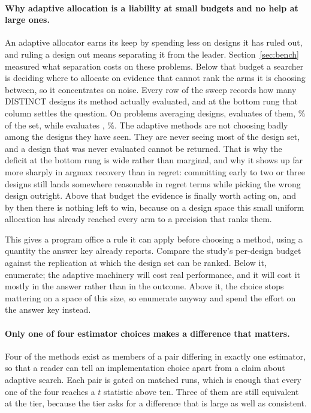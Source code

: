 \documentclass[11pt]{article}
\begin{document}
\paragraph{Why adaptive allocation is a liability at small budgets and no help at large ones.} An
adaptive allocator earns its keep by spending less on designs it has ruled out, and ruling a design
out means separating it from the leader. Section~\ref{sec:bench} measured what separation costs on
these problems. Below that budget a searcher is deciding where to allocate on evidence that cannot
rank the arms it is choosing between, so it concentrates on noise. Every row of the sweep records
how many DISTINCT designs its method actually evaluated, and at the bottom rung that column settles
the question. On problems averaging \RsLowDesigns{} designs, \RsCrossTop{} evaluates
\RsLowTouchAdapt{} of them, \RsLowCoverAdapt{}\% of the set, while \RsCrossLow{} evaluates
\RsLowTouchUni{}, \RsLowCoverUni{}\%. The adaptive methods are not choosing badly among the designs
they have seen. They are never seeing most of the design set, and a design that was never evaluated
cannot be returned. That is why the deficit at the bottom rung is wide rather than marginal, and why
it shows up far more sharply in argmax recovery than in regret: committing early to two or three
designs still lands somewhere reasonable in regret terms while picking the wrong design outright.
Above that budget the evidence is finally worth acting on, and by then there is nothing left to win,
because on a design space this small uniform allocation has already reached every arm to a
precision that ranks them.

This gives a program office a rule it can apply before choosing a method, using a quantity the
answer key already reports. Compare the study's per-design budget against the replication at which
the design set can be ranked. Below it, enumerate; the adaptive machinery will cost real
performance, and it will cost it mostly in the answer rather than in the outcome. Above it, the
choice stops mattering on a space of this size, so enumerate anyway and spend the effort on the
answer key instead.

\paragraph{Only one of four estimator choices makes a difference that matters.} Four of the
\RsMethods{} methods exist as members of a pair differing in exactly one estimator, so that a reader
can tell an implementation choice apart from a claim about adaptive search. Each pair is gated on
\RsDiscVarN{} matched runs, which is enough that every one of the four reaches a $t$ statistic
above ten. Three of them are still equivalent at the tier, because the tier asks for a difference
that is large as well as consistent.
\end{document}

